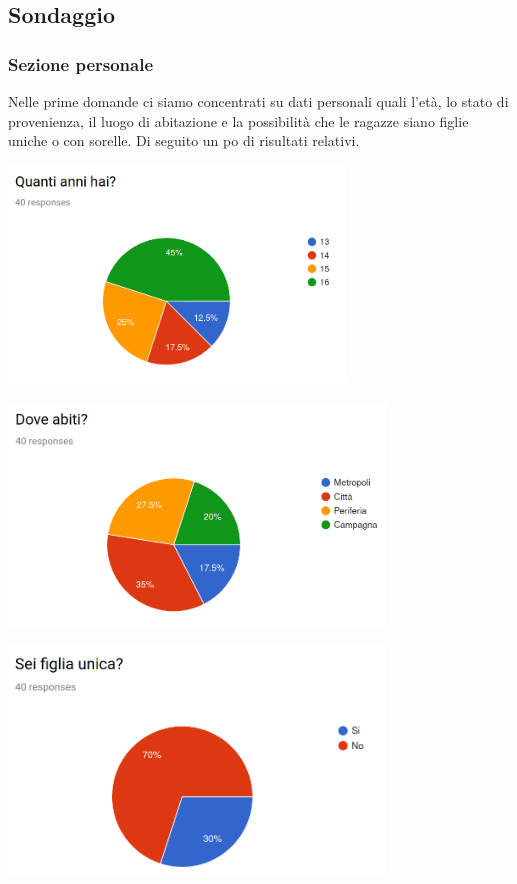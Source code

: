 \documentclass[12pt,a4paper]{report}
\begin{document}
\subsection{Sondaggio}
\subsubsection{Sezione personale}
Nelle prime domande ci siamo concentrati su dati personali quali l'età, lo stato di provenienza, il luogo di abitazione e la possibilità che le ragazze siano figlie uniche o con sorelle. Di seguito un po di risultati relativi.
\begin{flushleft}
  \includegraphics[width=0.67\textwidth]{"Images Latex/Grafici Sondaggi/1 - Quanti anni hai"}
\end{flushleft}
\begin{flushleft}
  \includegraphics[width=0.75\textwidth]{"Images Latex/Grafici Sondaggi/2 - Dove abiti"}
\end{flushleft}
\begin{flushleft}
  \includegraphics[width=0.75\textwidth]{"Images Latex/Grafici Sondaggi/3 - Sei figlia unica"}
\end{flushleft}
\end{document}
